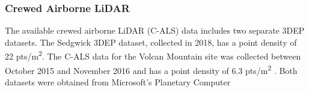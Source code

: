 \documentclass[preprints,article,accept,pdftex,moreauthors]{Definitions/mdpi}
\begin{document}
\subsubsection{Crewed Airborne LiDAR}
The available crewed airborne LiDAR (C-ALS) data includes two separate 3DEP datasets. The  Sedgwick  3DEP dataset, collected in 2018, has a point density of 22 pts/m\textsuperscript{2}. The C-ALS data for the Volcan Mountain site was collected between October 2015 and November 2016 and has a point density of 6.3 pts/m\textsuperscript{2} \citep{usgs_usgs_2016}. Both datasets were obtained from Microsoft's Planetary Computer \citep{us_geological_survey_3d_elevation_program_usgs_2023,planetary_computer}

\begin{table}[H]
\centering
\caption{Timeline of NAIP and UAVSAR acquisitions for both study sites.}
\label{tab:imagery_timeline_v2}
\end{table}
\end{document}
